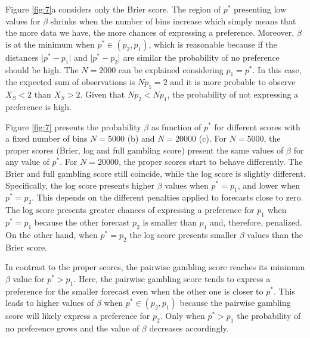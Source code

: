 \documentclass[referee,sn-basic]{sn-jnl}
\theoremstyle{thmstyleone}%
\theoremstyle{thmstyletwo}%
\theoremstyle{thmstylethree}%
\begin{document}
Figure \ref{fig:7}a considers only the Brier score. The region of $p^*$ presenting low values for $\beta$ shrinks when the number of bins increase which simply means that the more data we have, the more chances of expressing a preference. Moreover, $\beta$ is at the minimum when $p^* \in (p_2, p_1)$, which is reasonable because if the distances $\vert p^* - p_1\vert $ and $\vert p^* - p_2\vert $ are similar the probability of no preference should be high. The $N = 2000$ can be explained considering $p_1 = p^*$. In this case, the expected sum of observations is $Np_1 = 2$ and it is more probable to observe $X_S < 2$ than $X_S > 2$. Given that $Np_2 < Np_1$, the probability of not expressing a preference is high. 

Figure \ref{fig:7} presents the probability $\beta$ as function of $p^*$ for different scores with a fixed number of bins $N = 5000$ (b) and $N = 20000$ (c). For $N = 5000$, the proper scores (Brier, log and full gambling score) present the same values of $\beta$ for any value of $p^*$. For $N = 20000$, the proper scores start to behave differently. The Brier and full gambling score still coincide, while the log score is slightly different. Specifically, the log score presents higher $\beta$ values when $p^* = p_1$, and lower when $p^* = p_2$. This depends on the different penalties applied to forecasts close to zero. The log score presents greater chances of expressing a preference for $p_1$ when $p^* = p_1$ because the other forecast $p_2$ is smaller than $p_1$ and, therefore, penalized. On the other hand, when $p^* = p_2$ the log score presents smaller $\beta$ values than the Brier score.    

In contrast to the proper scores, the pairwise gambling score reaches its minimum $\beta$ value for $p^* > p_1$. Here, the pairwise gambling score tends to express a preference for the smaller forecast even when the other one is closer to $p^*$. This leads to higher values of $\beta$ when $p^* \in (p_2, p_1)$ because the pairwise gambling score will likely express a preference for $p_2$. Only when $p^* > p_1$ the probability of no preference grows and the value of $\beta$ decreases accordingly.
\end{document}
